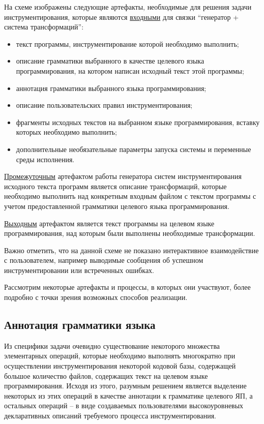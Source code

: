 На схеме изображены следующие артефакты, необходимые для решения задачи инструментирования, которые являются \underline{входными} для связки ``генератор + система трансформаций'':
\begin{itemize}[noitemsep]
  \item текст программы, инструментирование которой необходимо выполнить;
  \item описание грамматики выбранного в качестве целевого языка программирования, на котором написан исходный текст этой программы;
  \item аннотация грамматики выбранного языка программирования;
  \item описание пользовательских правил инструментирования;
  \item фрагменты исходных текстов на выбранном языке программирования, вставку которых необходимо выполнить;
  \item дополнительные необязательные параметры запуска системы и переменные среды исполнения.
\end{itemize}

\underline{Промежуточным} артефактом работы генератора систем инструментирования исходного текста программ является описание трансформаций, которые необходимо выполнить над конкретным входным файлом с текстом программы с учетом предоставленной грамматики целевого языка программирования.

\underline{Выходным} артефактом является текст программы на целевом языке программирования, над которым были выполнены необходимые трансформации.

Важно отметить, что на данной схеме не показано интерактивное взаимодействие с пользователем, например выводимые сообщения об успешном инструментировании или встреченных ошибках.

Рассмотрим некоторые артефакты и процессы, в которых они участвуют, более подробно с точки зрения возможных способов реализации.

\subsection{Аннотация грамматики языка}

Из специфики задачи очевидно существование некоторого множества элементарных операций, которые необходимо выполнять многократно при осуществлении инструментирования некоторой кодовой базы, содержащей большое количество файлов, содержащих текст на целевом языке программирования.
Исходя из этого, разумным решением является выделение некоторых из этих операций в качестве аннотации к грамматике целевого ЯП, а остальных операций -- в виде создаваемых пользователями высокоуровневых декларативных описаний требуемого процесса инструментирования.

